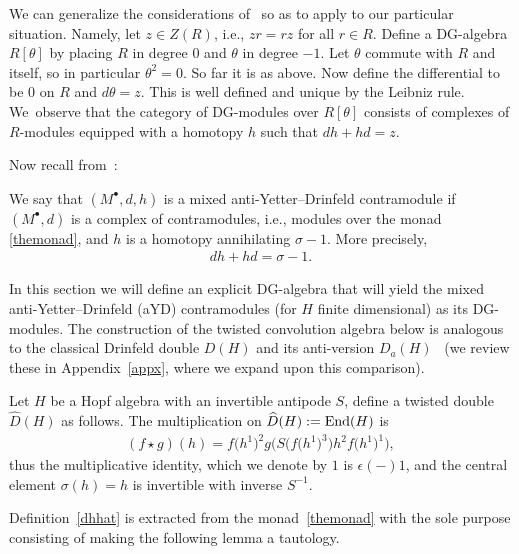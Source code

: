 \documentclass[10pt,a4paper]{amsart}
\numberwithin{equation}{section}
\begin{document}
We can generalize the considerations of~\cite{kassel} so as to apply to our particular situation. Namely, let $z\in Z(R)$, i.e., $zr=rz$ for all $r\in R$. Define a DG-algebra $R[\theta]$ by placing $R$ in degree $0$ and $\theta$ in degree $-1$. Let $\theta$ commute with $R$ and itself, so in particular $\theta^2=0$. So far it is as above. Now define the differential to be $0$ on $R$ and $d\theta=z$. This is well defined and unique by the Leibniz rule. We~observe that the category of DG-modules over $R[\theta]$ consists of complexes of $R$-modules equipped with a homotopy $h$ such that $dh+hd=z$.

Now recall from~\cite{chern}:

\begin{Definition}
We say that $(M^\bullet,d,h)$ is a mixed anti-Yetter--Drinfeld contramodule if $(M^\bullet,d)$ is a complex of contramodules, i.e., modules over the monad \eqref{themonad}, and $h$ is a homotopy annihilating $\sigma-1$. More precisely,
\begin{gather}
dh+hd=\sigma-1.
\end{gather}
\end{Definition}

In this section we will define an explicit DG-algebra that will yield the mixed anti-Yetter--Drinfeld (aYD) contramodules (for $H$ finite dimensional) as its DG-modules. The construction of the twisted convolution algebra below is analogous to the classical Drinfeld double $D(H)$ and its anti-version $D_a(H)$~\cite{HKRS2} (we review these in Appendix~\ref{appx}, where we expand upon this comparison).

\begin{Definition}\label{dhhat}
Let $H$ be a Hopf algebra with an invertible antipode $S$, define a twisted double~$\widehat{D}(H)$ as follows. The multiplication on $\widehat{D}(H):={\rm End}(H)$ is
\begin{gather}\label{mult}
(f\star g)(h)= f\big(h^1\big)^2g\big(S\big(f\big(h^1\big)^3\big)h^2f\big(h^1\big)^1\big),
\end{gather}
thus the multiplicative identity, which we denote by $1$ is $\epsilon(-)1$, and the central element $\sigma(h)=h$ is invertible with inverse $S^{-1}$.
\end{Definition}

Definition~\ref{dhhat} is extracted from the monad~\eqref{themonad} with the sole purpose consisting of making the following lemma a tautology.
\end{document}
